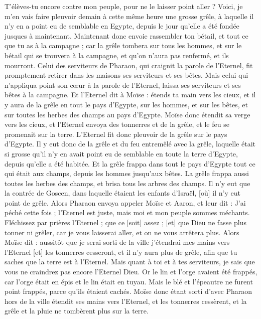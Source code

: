 \begin{multicols}{2}
T'élèves-tu encore contre mon peuple, pour ne le laisser point aller ?
Voici, je m'en vais faire pleuvoir demain à cette même heure une grosse grêle, à laquelle il n'y en a point eu de semblable en Egypte, depuis le jour qu'elle a été fondée jusques à maintenant.
Maintenant donc envoie rassembler ton bétail, et tout ce que tu as à la campagne ; car la grêle tombera sur tous les hommes, et sur le bétail qui se trouvera à la campagne, et qu'on n'aura pas renfermé, et ils mourront.
Celui des serviteurs de Pharaon, qui craignit la parole de l'Eternel, fit promptement retirer dans les maisons ses serviteurs et ses bêtes.
Mais celui qui n'appliqua point son cœur à la parole de l'Eternel, laissa ses serviteurs et ses bêtes à la campagne.
Et l'Eternel dit à Moïse : étends ta main vers les cieux, et il y aura de la grêle en tout le pays d'Egypte, sur les hommes, et sur les bêtes, et sur toutes les herbes des champs au pays d'Egypte.
Moïse donc étendit sa verge vers les cieux, et l'Eternel envoya des tonnerres et de la grêle, et le feu se promenait sur la terre. L'Eternel fit donc pleuvoir de la grêle sur le pays d'Egypte.
Il y eut donc de la grêle et du feu entremêlé avec la grêle, laquelle était si grosse qu'il n'y en avait point eu de semblable en toute la terre d'Egypte, depuis qu'elle a été habitée.
Et la grêle frappa dans tout le pays d'Egypte tout ce qui était aux champs, depuis les hommes jusqu'aux bêtes. La grêle frappa aussi toutes les herbes des champs, et brisa tous les arbres des champs.
Il n'y eut que la contrée de Goscen, dans laquelle étaient les enfants d'Israël, [où] il n'y eut point de grêle.
Alors Pharaon envoya appeler Moïse et Aaron, et leur dit : J'ai péché cette fois ; l'Eternel est juste, mais moi et mon peuple sommes méchants.
Fléchissez par prières l'Eternel ; que ce [soit] assez ; [et] que Dieu ne fasse plus tonner ni grêler, car je vous laisserai aller, et on ne vous arrêtera plus.
Alors Moïse dit : aussitôt que je serai sorti de la ville j'étendrai mes mains vers l'Eternel [et] les tonnerres cesseront, et il n'y aura plus de grêle, afin que tu saches que la terre est à l'Eternel.
Mais quant à toi et à tes serviteurs, je sais que vous ne craindrez pas encore l'Eternel Dieu.
Or le lin et l'orge avaient été frappés, car l'orge était en épis et le lin était en tuyau.
Mais le blé et l'épeautre ne furent point frappés, parce qu'ils étaient cachés.
Moïse donc étant sorti d'avec Pharaon hors de la ville étendit ses mains vers l'Eternel, et les tonnerres cessèrent, et la grêle et la pluie ne tombèrent plus sur la terre.

\end{multicols}
